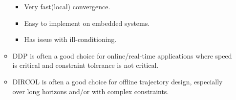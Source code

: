 \begin{itemize}
\begin{itemize}
\begin{itemize}
            \item Very fast(local) convergence.
            \item Easy to implement on embedded systems.
            \item Has issue with ill-conditioning.
        \end{itemize}
        \item DDP is often a good choice for online/real-time applications where speed is critical and constraint tolerance is not critical.
        \item DIRCOL is often a good choice for offline trajectory design, especially over long horizons and/or with complex constraints.
    \end{itemize}
\end{itemize}







